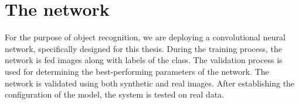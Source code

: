 \section{The network}

For the purpose of object recognition, we are deploying a  convolutional neural network, specifically designed for this thesis. During the training process, the network is fed images along with labels of the class. %
The validation process is used for determining the best-performing parameters of the network. The network is validated using both synthetic and real images.
After establishing the configuration of the model, the system is tested on real data.



